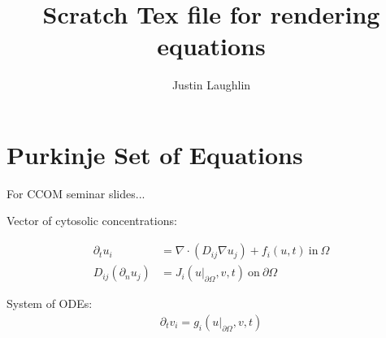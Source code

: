 \documentclass[11pt]{article}
\begin{document}
\title{Scratch Tex file for rendering equations}
%
\author{Justin Laughlin}
\maketitle


\section{Purkinje Set of Equations}
For CCOM seminar slides...

Vector of cytosolic concentrations:

\begin{align*}
\partial_t u_i &= \nabla \cdot (D_{ij} \nabla u_j) + f_i(u,t) ~\text{in}~ \Omega \\
D_{ij} (\partial_n u_j) &= J_i(u|_{\partial\Omega},v,t) ~\text{on}~ \partial\Omega
\end{align*}

System of ODEs:
\begin{align*}
\partial_t v_i = g_i(u|_{\partial\Omega},v,t)
\end{align*}



\phantom{a}\newpage
%
%



\end{document}
